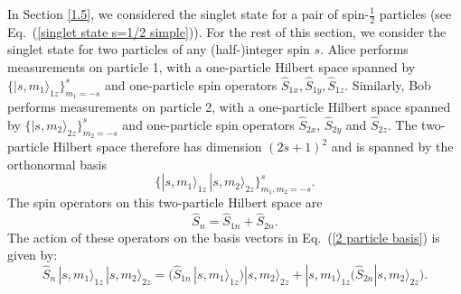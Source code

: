 In Section \ref{1.5}, we considered the singlet state for a pair of spin-$\frac12$ particles (see Eq.\ (\ref{singlet state s=1/2 simple})). For the rest of this section, we consider the singlet state for two particles of any (half-)integer spin $s$. Alice performs measurements on particle 1, with a one-particle Hilbert space spanned by $\{|s,m_1\rangle_{1z}\}_{m_1=-s}^s$ and one-particle spin operators $\hat{S}_{1x},\hat{S}_{1y},\hat{S}_{1z}$. Similarly, Bob performs measurements on particle 2, with a one-particle Hilbert space spanned by $\{|s,m_2\rangle_{2z}\}_{m_2=-s}^s$ and one-particle spin operators $\hat{S}_{2x}$, $\hat{S}_{2y}$ and $\hat{S}_{2z}$. The two-particle Hilbert space therefore has dimension $(2s+1)^2$ and is spanned by the orthonormal basis
\begin{equation}
\big\{|s,m_1\rangle_{1z} \, |s,m_2\rangle_{2z}\big\}_{m_1, m_2=-s}^s.
\label{2 particle basis}
\end{equation}
The spin operators on this two-particle Hilbert space are 
\begin{equation}
\hat{S}_{n}=\hat{S}_{1n}+\hat{S}_{2n}.
\label{total spin ops}
\end{equation}
The action of these operators on the basis vectors in Eq.\ (\ref{2 particle basis}) is given by:
\begin{equation}
\hat{S}_{n} \, |s,m_1\rangle_{1z} \, |s,m_2\rangle_{2z} = \Big( \hat{S}_{1n} \, |s,m_1\rangle_{1z} \Big) |s,m_2\rangle_{2z}
+ |s,m_1\rangle_{1z} \Big( \hat{S}_{2n} |s,m_2\rangle_{2z} \Big).
\label{total spin ops action}
\end{equation}

